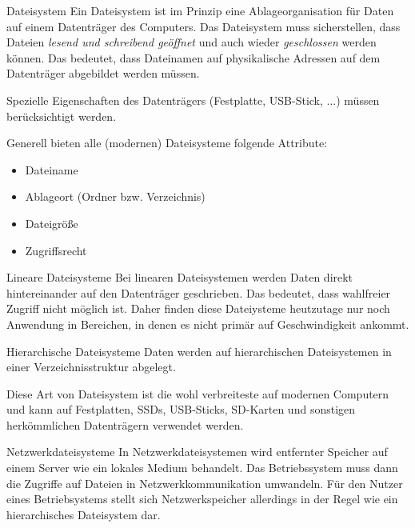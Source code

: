 \begin{defi}{Dateisystem}
    Ein Dateisystem ist im Prinzip eine Ablageorganisation für Daten auf einem Datenträger des Computers.
    Das Dateisystem muss sicherstellen,
    dass Dateien \emph{lesend und schreibend geöffnet} und auch wieder \emph{geschlossen} werden
    können. Das bedeutet, dass Dateinamen auf physikalische Adressen auf dem
    Datenträger abgebildet werden müssen.

    Spezielle Eigenschaften des Datenträgers
    (Festplatte, USB-Stick, ...) müssen berücksichtigt werden.

    Generell bieten
    alle (modernen) Dateisysteme folgende Attribute:
    \begin{itemize}
        \item Dateiname
        \item Ablageort (Ordner bzw. Verzeichnis)
        \item Dateigröße
        \item Zugriffsrecht
    \end{itemize}
\end{defi}

\begin{defi}{Lineare Dateisysteme}
    Bei linearen Dateisystemen werden Daten direkt hintereinander auf den Datenträger
    geschrieben. Das bedeutet, dass wahlfreier Zugriff nicht möglich ist. Daher finden
    diese Dateiysteme heutzutage nur noch Anwendung in Bereichen, in denen es nicht
    primär auf Geschwindigkeit ankommt.
\end{defi}

\begin{defi}{Hierarchische Dateisysteme}
    Daten werden auf hierarchischen Dateisystemen in einer Verzeichnisstruktur
    abgelegt.

    Diese Art von Dateisystem ist die wohl verbreiteste auf
    modernen Computern und kann auf Festplatten, SSDs, USB-Sticks, SD-Karten und
    sonstigen herkömmlichen Datenträgern verwendet werden.
\end{defi}

\begin{defi}{Netzwerkdateisysteme}
    In Netzwerkdateisystemen wird entfernter
    Speicher auf einem Server wie ein lokales Medium behandelt. Das Betriebssystem
    muss dann die Zugriffe auf Dateien in Netzwerkkommunikation umwandeln.
    Für den Nutzer
    eines Betriebsystems stellt sich Netzwerkspeicher allerdings in der Regel wie ein
    hierarchisches Dateisystem dar.
\end{defi}

